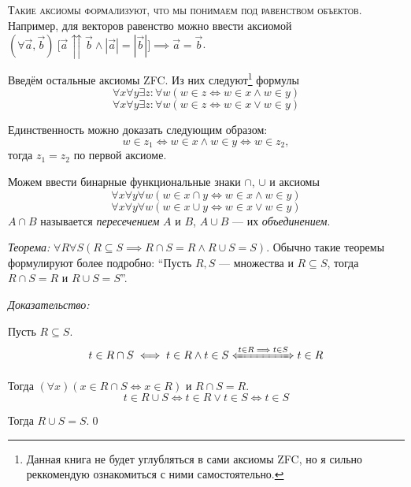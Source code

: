 \textsc{Такие аксиомы формализуют, что мы понимаем под равенством объектов.}
Например, для векторов равенство можно ввести аксиомой
$(\forall \vec{a},\vec{b})~
\big[\vec{a}\upuparrows\vec{b}\land|\vec{a}|=|\vec{b}|\big]
\implies \vec{a}=\vec{b}$.

Введём остальные аксиомы ZFC. Из них следуют\footnote{
	Данная книга не будет углубляться в сами аксиомы ZFC, но я сильно реккомендую
	ознакомиться с ними самостоятельно.}
формулы
\[
	\forall x\forall y\exists z:\forall w(w\in z\iff w\in x\land w\in y)
\]
\[
	\forall x\forall y\exists z:\forall w(w\in z\iff w\in x\lor w\in y)
\]

Единственность можно доказать следующим образом:
\[
	w\in z_1\iff w\in x\land w\in y\iff w\in z_2,
\]
тогда $z_1=z_2$ по первой аксиоме.

Можем ввести бинарные функциональные знаки $\cap$, $\cup$ и аксиомы
\[
	\forall x\forall y\forall w(w\in x\cap y\iff w\in x\land w\in y)
\]
\[
	\forall x\forall y\forall w(w\in x\cup y\iff w\in x\lor w\in y)
\]
$A\cap B$ называется {\it пересечением} $A$ и $B$,
$A\cup B$ --- их {\it объединением}.

\vspace{1em}
{\it Теорема:} ${\forall R\forall S(R\subseteq S\implies R\cap S=R\land R\cup S=S)}$.
Обычно такие теоремы формулируют более подробно:
``Пусть $R,S$ --- множества и $R\subseteq S$, тогда $R\cap S=R$ и $R\cup S=S$''.

{\it Доказательство:}

Пусть $R\subseteq S$.
\[
	t\in R\cap S\iff t\in R\land t\in S\xLeftrightarrow{t\in R\implies t\in S} t\in R
\]

Тогда $(\forall x)(x\in R\cap S\iff x\in R)$ и $R\cap S=R$.
\[
	t\in R\cup S\iff t\in R\lor t\in S\iff t\in S
\]

Тогда $R\cup S=S$.\qed


